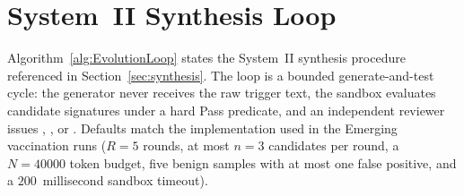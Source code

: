 \section{System~II Synthesis Loop}
\label{app:system-ii-loop}



Algorithm~\ref{alg:EvolutionLoop} states the System~II synthesis
procedure referenced in Section~\ref{sec:synthesis}. The loop is a
bounded generate-and-test cycle: the generator never receives the raw
trigger text, the sandbox evaluates candidate signatures under a hard
Pass predicate, and an independent reviewer issues
, , or . Defaults match the
implementation used in the Emerging vaccination runs ($R{=}5$ rounds,
at most $n{=}3$ candidates per round, a $N{=}40000$ token budget, five
benign samples with at most one false positive, and a $200$~millisecond sandbox
timeout).
